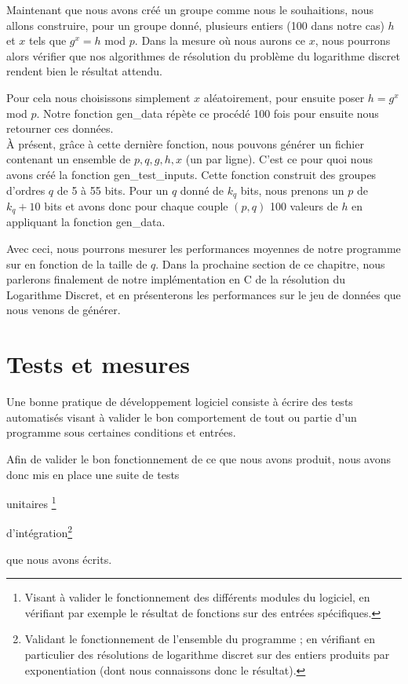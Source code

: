         Maintenant que nous avons créé un groupe comme nous le souhaitions, nous allons construire, pour un groupe donné, plusieurs entiers (100 dans notre cas) $h$ et $x$ tels que $g^x = h$ mod $p$. Dans la mesure où nous aurons ce $x$, nous pourrons alors vérifier que nos algorithmes de résolution du problème du logarithme discret rendent bien le résultat attendu.

        Pour cela nous choisissons simplement $x$ aléatoirement, pour ensuite poser $h = g^x$ mod $p$. Notre fonction gen\_data répète ce procédé 100 fois pour ensuite nous retourner ces données.\\

        À présent, grâce à cette dernière fonction, nous pouvons générer un fichier contenant un ensemble de $p, q, g, h, x$ (un par ligne). C'est ce pour quoi nous avons créé la fonction gen\_test\_inputs. Cette fonction construit des groupes d'ordres $q$ de 5 à 55 bits. Pour un $q$ donné de $k_q$ bits, nous prenons un $p$ de $k_q + 10$ bits et avons donc pour chaque couple $(p,q)$ 100 valeurs de $h$ en appliquant la fonction gen\_data.

        Avec ceci, nous pourrons mesurer les performances moyennes de notre programme sur en fonction de la taille de $q$. Dans la prochaine section de ce chapitre, nous parlerons finalement de notre implémentation en C de la résolution du Logarithme Discret, et en présenterons les performances sur le jeu de données que nous venons de générer.


    \section{Tests et mesures}
      Une bonne pratique de développement logiciel consiste à écrire des tests automatisés visant à valider le bon comportement de tout ou partie d'un programme sous certaines conditions et entrées.

      Afin de valider le bon fonctionnement de ce que nous avons produit, nous avons donc mis en place une suite de tests
      \begin{enumerate*}
        \item unitaires \footnote{Visant à valider le fonctionnement des différents modules du logiciel, en vérifiant par exemple le résultat de fonctions sur des entrées spécifiques.}
        \item d'intégration\footnote{Validant le fonctionnement de l'ensemble du programme ; en vérifiant en particulier des résolutions de logarithme discret sur des entiers produits par exponentiation (dont nous connaissons donc le résultat).}
      \end{enumerate*}
      que nous avons écrits.


